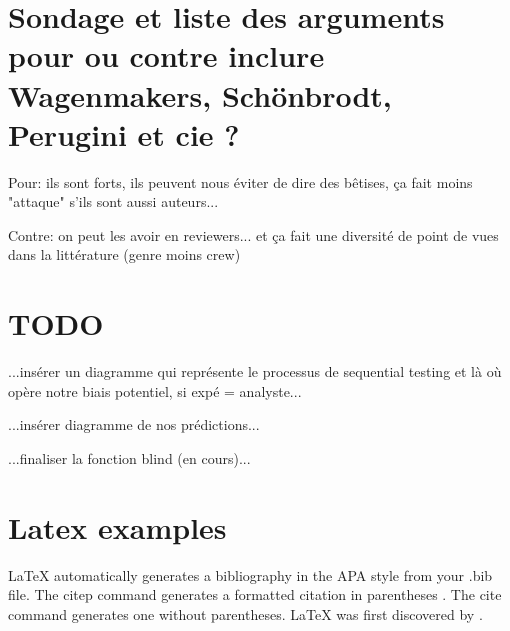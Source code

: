 \documentclass[a4paper,man,natbib]{apa6}
\begin{document}
\section{Sondage et liste des arguments pour ou contre inclure Wagenmakers, Schönbrodt, Perugini et cie ?}

Pour: ils sont forts, ils peuvent nous éviter de dire des bêtises, ça fait moins "attaque" s'ils sont aussi auteurs...	

Contre: on peut les avoir en reviewers... et ça fait une diversité de point de vues dans la littérature (genre moins crew)

\section{TODO}

...insérer un diagramme qui représente le processus de sequential testing et là où opère notre biais potentiel, si expé = analyste...

...insérer diagramme de nos prédictions...

...finaliser la fonction blind (en cours)...


\section{Latex examples}

LaTeX automatically generates a bibliography in the APA style from your .bib file. The citep command generates a formatted citation in parentheses \citep{Lamport1986}. The cite command generates one without parentheses. LaTeX was first discovered by \cite{Lamport1986}.



\end{document}
